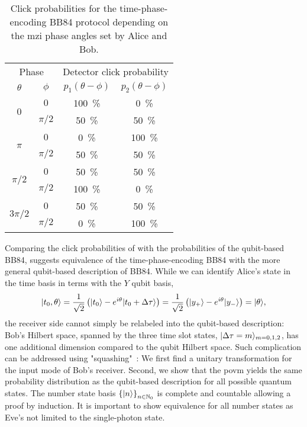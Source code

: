 \begin{table}[htb]
	\centering
	\begin{tabular}{cccc}
		\toprule
		\multicolumn{2}{c}{Phase} & \multicolumn{2}{c}{Detector click probability} \\
		\cmidrule{1-2}
		\cmidrule{3-4}
		$\theta$ & $\phi$ & $p_1(\theta-\phi)$ & $p_2(\theta-\phi)$ \\
		\midrule
		\multirow{2}{*}{$0$} & $0$ & \SI{100}{\percent} & \SI{0}{\percent} \\
		& $\pi/2$ & \SI{50}{\percent} & \SI{50}{\percent} \\
		\cmidrule{1-2}
		\multirow{2}{*}{$\pi$} & $0$ & \SI{0}{\percent} & \SI{100}{\percent} \\
		& $\pi/2$ & \SI{50}{\percent} & \SI{50}{\percent} \\
		\cmidrule{1-2}
		\multirow{2}{*}{$\pi/2$} & $0$ & \SI{50}{\percent} & \SI{50}{\percent} \\
		& $\pi/2$ & \SI{100}{\percent} & \SI{0}{\percent} \\
		\cmidrule{1-2}
		\multirow{2}{*}{$3\pi/2$} & $0$ & \SI{50}{\percent} & \SI{50}{\percent} \\
		& $\pi/2$ & \SI{0}{\percent} & \SI{100}{\percent} \\
		\bottomrule
	\end{tabular}
	\caption{Click probabilities for the time-phase-encoding BB84 protocol depending on the \gls{mzi} phase angles set by Alice and Bob.}\label{tab:bb84_time_phase_clicks}
\end{table}
Comparing the click probabilities of  with the probabilities of the qubit-based BB84, suggests equivalence of the time-phase-encoding BB84 with the more general qubit-based description of BB84.
While we can identify Alice's state in the time basis in terms with the $Y$ qubit basis,
\begin{equation}
	\lvert t_0,\theta\rangle
	=
	\frac{1}{\sqrt{2}}
	\left(
		\lvert t_0\rangle
		-
		e^{i\theta}
		\lvert t_0+\Delta\tau\rangle
	\right)
	=
	\frac{1}{\sqrt{2}}
	\left(
		\lvert y_+\rangle
		-
		e^{i\theta}
		\lvert y_-\rangle
	\right)
	=
	\lvert\theta\rangle
	,
\end{equation}
the receiver side cannot simply be relabeled into the qubit-based description:
Bob's Hilbert space, spanned by the three time slot states, $\lvert\Delta\tau=m\rangle_{m=0,1,2}$, has one additional dimension compared to the qubit Hilbert space.
Such complication can be addressed using "squashing"~\cite{Beaudry2008,Gittsovich2014}:
We first find a unitary transformation for the input mode of Bob's receiver.
Second, we show that the \gls{povm} yields the same probability distribution as the qubit-based description for all possible quantum states.
The number state basis $\left\{\lvert n\rangle\right\}_{n\in\mathbb{N}_0}$ is complete and countable allowing a proof by induction.
It is important to show equivalence for all number states as Eve's not limited to the single-photon state.